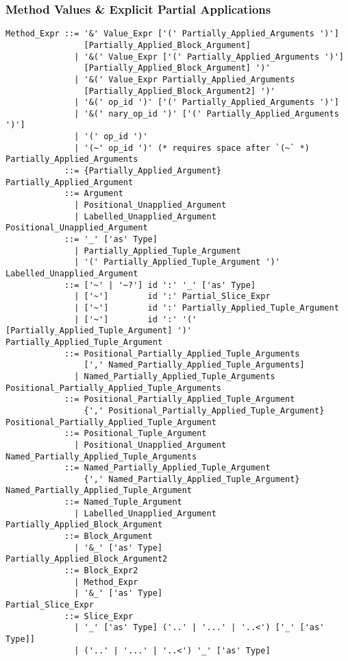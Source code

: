 \subsubsection{Method Values \& Explicit Partial Applications}
\label{sec:method-values}

\syntax\begin{lstlisting}
Method_Expr ::= '&' Value_Expr ['(' Partially_Applied_Arguments ')']
                [Partially_Applied_Block_Argument]
              | '&(' Value_Expr ['(' Partially_Applied_Arguments ')']
                [Partially_Applied_Block_Argument] ')'
              | '&(' Value_Expr Partially_Applied_Arguments
                [Partially_Applied_Block_Argument2] ')'
              | '&(' op_id ')' ['(' Partially_Applied_Arguments ')']
              | '&(' nary_op_id ')' ['(' Partially_Applied_Arguments ')']
              | '(' op_id ')'
              | '(~' op_id ')' (* requires space after `(~` *)
Partially_Applied_Arguments
            ::= {Partially_Applied_Argument} 
Partially_Applied_Argument
            ::= Argument
              | Positional_Unapplied_Argument
              | Labelled_Unapplied_Argument
Positional_Unapplied_Argument
            ::= '_' ['as' Type]
              | Partially_Applied_Tuple_Argument
              | '(' Partially_Applied_Tuple_Argument ')'
Labelled_Unapplied_Argument
            ::= ['~' | '~?'] id ':' '_' ['as' Type]
              | ['~']        id ':' Partial_Slice_Expr
              | ['~']        id ':' Partially_Applied_Tuple_Argument
              | ['~']        id ':' '(' [Partially_Applied_Tuple_Argument] ')'
Partially_Applied_Tuple_Argument
            ::= Positional_Partially_Applied_Tuple_Arguments 
                [',' Named_Partially_Applied_Tuple_Arguments]
              | Named_Partially_Applied_Tuple_Arguments
Positional_Partially_Applied_Tuple_Arguments 
            ::= Positional_Partially_Applied_Tuple_Argument
                {',' Positional_Partially_Applied_Tuple_Argument}
Positional_Partially_Applied_Tuple_Argument
            ::= Positional_Tuple_Argument
              | Positional_Unapplied_Argument
Named_Partially_Applied_Tuple_Arguments
            ::= Named_Partially_Applied_Tuple_Argument 
                {',' Named_Partially_Applied_Tuple_Argument}
Named_Partially_Applied_Tuple_Argument
            ::= Named_Tuple_Argument
              | Labelled_Unapplied_Argument
Partially_Applied_Block_Argument
            ::= Block_Argument
              | '&_' ['as' Type]
Partially_Applied_Block_Argument2
            ::= Block_Expr2
              | Method_Expr
              | '&_' ['as' Type]
Partial_Slice_Expr
            ::= Slice_Expr
              | '_' ['as' Type] ('..' | '...' | '..<') ['_' ['as' Type]]
              | ('..' | '...' | '..<') '_' ['as' Type]
\end{lstlisting}

